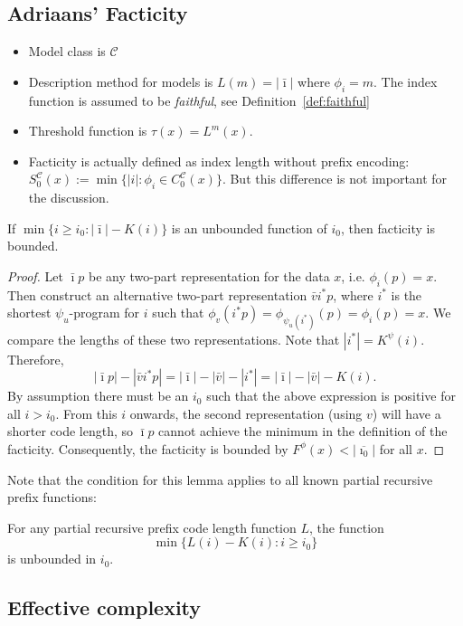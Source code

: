 \documentclass{style/llncs}
\newcommand{\C}{\mathcal C}
\begin{document}
\subsection{Adriaans' Facticity}

\begin{itemize}
\item Model class is $\C$
\item Description method for models is $L(m)=|\bar\imath|$ where
  $\phi_i=m$. The index function is assumed to be \emph{faithful}, see
  Definition~\ref{def:faithful}
\item Threshold function is $\tau(x)=L^m(x)$.
\item Facticity is actually defined as index length without prefix
  encoding:  $S^\C_0(x):=\min\{|i|:\phi_i\in C^\C_0(x)\}$. But this
  difference is not important for the discussion.
\end{itemize}


\begin{lemma}
  If $\min\{i\ge i_0:|\bar\imath|-K(i)\}$ is an unbounded function of $i_0$, then facticity is bounded.
\end{lemma}
\begin{proof}
Let $\bar\imath p$ be any two-part representation for the data $x$, i.e. $\phi_i(p)=x$. Then construct an alternative two-part representation $\bar vi^* p$, where $i^*$ is the shortest $\psi_u$-program for $i$ such that $\phi_v(i^* p)=\phi_{\psi_u(i^*)}(p) = \phi_i(p)=x$. We compare the lengths of these two representations. Note that $|i^*|=K^\psi(i)$. Therefore,
\[
|\bar\imath p|-|\bar v i^* p| = |\bar\imath|-|\bar v| - |i^*| = |\bar\imath|-|\bar v|-K(i).
\]
By assumption there must be an $i_0$ such that the above expression is positive for all $i>i_0$. From this $i$ onwards, the second representation (using $v$) will have a shorter code length, so $\bar\imath p$ cannot achieve the minimum in the definition of the facticity. Consequently, the facticity is bounded by $F^\phi(x)<|\overline{\imath_0}|$ for all $x$. 
\end{proof}
Note that the condition for this lemma applies to all known partial recursive prefix functions:

\begin{conjecture}
For any partial recursive prefix code length function $L$, the function
\[
\min\{L(i)-K(i):i\ge i_0\}
\]
is unbounded in $i_0$.
\end{conjecture}

\subsection{Effective complexity}
\end{document}
